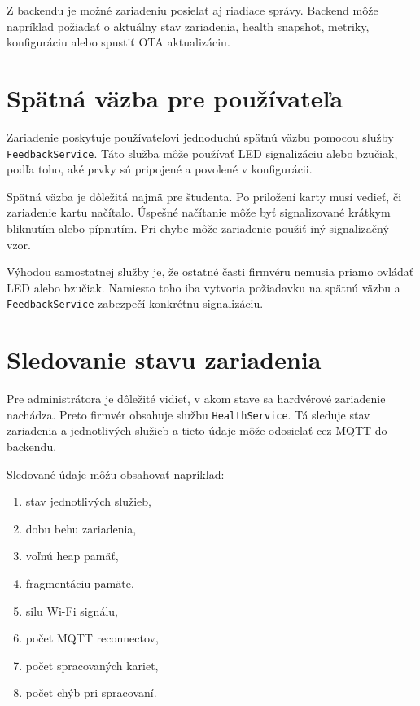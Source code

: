 Z backendu je možné zariadeniu posielať aj riadiace správy. Backend môže napríklad požiadať o aktuálny stav zariadenia, health snapshot, metriky, konfiguráciu alebo spustiť OTA aktualizáciu.

\section{Spätná väzba pre používateľa}
\label{subsec:hardware-feedback}

Zariadenie poskytuje používateľovi jednoduchú spätnú väzbu pomocou služby \texttt{FeedbackService}. Táto služba môže používať LED signalizáciu alebo bzučiak, podľa toho, aké prvky sú pripojené a povolené v konfigurácii.

Spätná väzba je dôležitá najmä pre študenta. Po priložení karty musí vedieť, či zariadenie kartu načítalo. Úspešné načítanie môže byť signalizované krátkym bliknutím alebo pípnutím. Pri chybe môže zariadenie použiť iný signalizačný vzor.

Výhodou samostatnej služby je, že ostatné časti firmvéru nemusia priamo ovládať LED alebo bzučiak. Namiesto toho iba vytvoria požiadavku na spätnú väzbu a \texttt{FeedbackService} zabezpečí konkrétnu signalizáciu.

\section{Sledovanie stavu zariadenia}
\label{subsec:hardware-health-monitoring}

Pre administrátora je dôležité vidieť, v akom stave sa hardvérové zariadenie nachádza. Preto firmvér obsahuje službu \texttt{HealthService}. Tá sleduje stav zariadenia a jednotlivých služieb a tieto údaje môže odosielať cez MQTT do backendu.

Sledované údaje môžu obsahovať napríklad:
\begin{enumerate}
    \item stav jednotlivých služieb,
    \item dobu behu zariadenia,
    \item voľnú heap pamäť,
    \item fragmentáciu pamäte,
    \item silu Wi-Fi signálu,
    \item počet MQTT reconnectov,
    \item počet spracovaných kariet,
    \item počet chýb pri spracovaní.
\end{enumerate}

